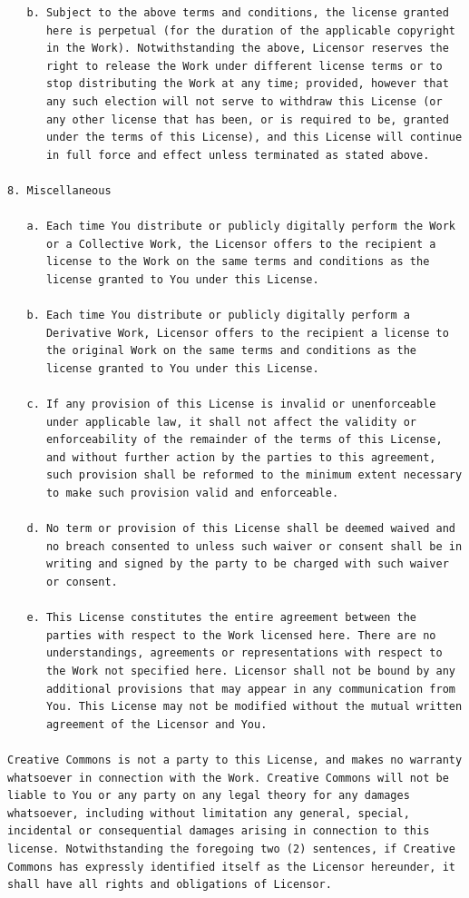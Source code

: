 \begin{verbatim}
   b. Subject to the above terms and conditions, the license granted
      here is perpetual (for the duration of the applicable copyright
      in the Work). Notwithstanding the above, Licensor reserves the
      right to release the Work under different license terms or to
      stop distributing the Work at any time; provided, however that
      any such election will not serve to withdraw this License (or
      any other license that has been, or is required to be, granted
      under the terms of this License), and this License will continue
      in full force and effect unless terminated as stated above.

8. Miscellaneous

   a. Each time You distribute or publicly digitally perform the Work
      or a Collective Work, the Licensor offers to the recipient a
      license to the Work on the same terms and conditions as the
      license granted to You under this License.

   b. Each time You distribute or publicly digitally perform a
      Derivative Work, Licensor offers to the recipient a license to
      the original Work on the same terms and conditions as the
      license granted to You under this License.

   c. If any provision of this License is invalid or unenforceable
      under applicable law, it shall not affect the validity or
      enforceability of the remainder of the terms of this License,
      and without further action by the parties to this agreement,
      such provision shall be reformed to the minimum extent necessary
      to make such provision valid and enforceable.

   d. No term or provision of this License shall be deemed waived and
      no breach consented to unless such waiver or consent shall be in
      writing and signed by the party to be charged with such waiver
      or consent.

   e. This License constitutes the entire agreement between the
      parties with respect to the Work licensed here. There are no
      understandings, agreements or representations with respect to
      the Work not specified here. Licensor shall not be bound by any
      additional provisions that may appear in any communication from
      You. This License may not be modified without the mutual written
      agreement of the Licensor and You.

Creative Commons is not a party to this License, and makes no warranty
whatsoever in connection with the Work. Creative Commons will not be
liable to You or any party on any legal theory for any damages
whatsoever, including without limitation any general, special,
incidental or consequential damages arising in connection to this
license. Notwithstanding the foregoing two (2) sentences, if Creative
Commons has expressly identified itself as the Licensor hereunder, it
shall have all rights and obligations of Licensor.


\end{verbatim}
